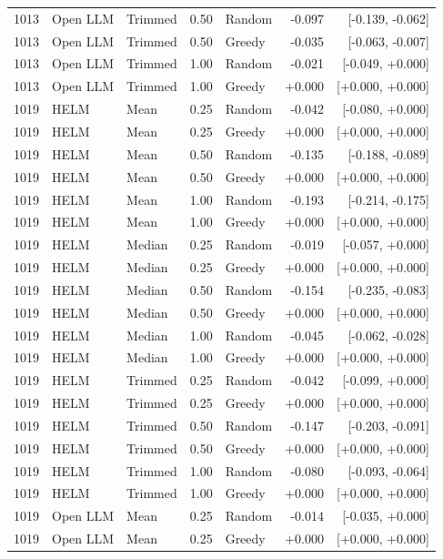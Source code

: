 \documentclass{article}
\begin{document}
\begin{longtable}{rlll lrr}
1013 & Open LLM & Trimmed & 0.50 & Random & -0.097 & [-0.139, -0.062] \\
1013 & Open LLM & Trimmed & 0.50 & Greedy & -0.035 & [-0.063, -0.007] \\
1013 & Open LLM & Trimmed & 1.00 & Random & -0.021 & [-0.049, +0.000] \\
1013 & Open LLM & Trimmed & 1.00 & Greedy & +0.000 & [+0.000, +0.000] \\
1019 & HELM & Mean & 0.25 & Random & -0.042 & [-0.080, +0.000] \\
1019 & HELM & Mean & 0.25 & Greedy & +0.000 & [+0.000, +0.000] \\
1019 & HELM & Mean & 0.50 & Random & -0.135 & [-0.188, -0.089] \\
1019 & HELM & Mean & 0.50 & Greedy & +0.000 & [+0.000, +0.000] \\
1019 & HELM & Mean & 1.00 & Random & -0.193 & [-0.214, -0.175] \\
1019 & HELM & Mean & 1.00 & Greedy & +0.000 & [+0.000, +0.000] \\
1019 & HELM & Median & 0.25 & Random & -0.019 & [-0.057, +0.000] \\
1019 & HELM & Median & 0.25 & Greedy & +0.000 & [+0.000, +0.000] \\
1019 & HELM & Median & 0.50 & Random & -0.154 & [-0.235, -0.083] \\
1019 & HELM & Median & 0.50 & Greedy & +0.000 & [+0.000, +0.000] \\
1019 & HELM & Median & 1.00 & Random & -0.045 & [-0.062, -0.028] \\
1019 & HELM & Median & 1.00 & Greedy & +0.000 & [+0.000, +0.000] \\
1019 & HELM & Trimmed & 0.25 & Random & -0.042 & [-0.099, +0.000] \\
1019 & HELM & Trimmed & 0.25 & Greedy & +0.000 & [+0.000, +0.000] \\
1019 & HELM & Trimmed & 0.50 & Random & -0.147 & [-0.203, -0.091] \\
1019 & HELM & Trimmed & 0.50 & Greedy & +0.000 & [+0.000, +0.000] \\
1019 & HELM & Trimmed & 1.00 & Random & -0.080 & [-0.093, -0.064] \\
1019 & HELM & Trimmed & 1.00 & Greedy & +0.000 & [+0.000, +0.000] \\
1019 & Open LLM & Mean & 0.25 & Random & -0.014 & [-0.035, +0.000] \\
1019 & Open LLM & Mean & 0.25 & Greedy & +0.000 & [+0.000, +0.000] \\

\end{longtable}
\end{document}

